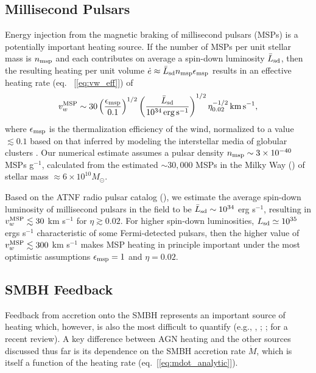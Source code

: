 \documentclass[usenatbib,fleqn]{mn2e}
\begin{document}
\subsection{Millisecond Pulsars}
Energy injection from the magnetic braking of millisecond pulsars
(MSPs) is a potentially important heating source.  If the number of
MSPs per unit stellar mass is $n_{\rm msp}$ and each contributes on
average a spin-down luminosity $\bar{L}_{\rm sd}$, then the resulting
heating per unit volume $\dot{e} \approx \bar{L}_{\rm sd}n_{\rm
  msp}\epsilon_{\rm msp}$ results in an effective heating rate (eq.~
[\ref{eq:vw_eff}]) of
\begin{eqnarray} v_{w}^{\rm MSP} \sim
30\left(\frac{\epsilon_{\rm msp}}{0.1}\right)^{1/2}\left(\frac{\bar{L}_{\rm
sd}}{10^{34}\,{\rm erg\,s^{-1}}}\right)^{1/2} \eta_{0.02}^{-1/2}\,{\rm
km\,s^{-1}},
 \label{eq:vmsp}
  \end{eqnarray} 
  where $\epsilon_{\rm msp}$ is the thermalization efficiency of the
  wind, normalized to a value $\lesssim 0.1$ based on that inferred by
  modeling the interstellar media of globular clusters
  \citep{NaimanSoares-Furtado+:2013a}.  Our numerical estimate assumes
  a pulsar density $n_{\rm msp} \sim 3 \times 10^{-40} $ MSPs
  g$^{-1}$, calculated from the estimated $\sim 30,000$ MSPs in the
  Milky Way (\citealt{Lorimer13}) of stellar mass $\approx 6\times
  10^{10}M_{\odot}$.

  Based on the ATNF radio pulsar catalog (\citealt{Manchester+05}), we
  estimate the average spin-down luminosity of millisecond pulsars in
  the field to be $\bar{L}_{\rm sd} \sim 10^{34}$ erg s$^{-1}$,
  resulting in $v_{w}^{\rm MSP} \lesssim 30$ km s$^{-1}$ for $\eta
  \gtrsim 0.02$.  For higher spin-down luminosities, $L_{\rm sd}\simeq
  10^{35}$ ergs s$^{-1}$ characteristic of some Fermi-detected
  pulsars, then the higher value of $v_{w}^{\rm MSP} \lesssim 300$ km
  s$^{-1}$ makes MSP heating in principle important under the most
  optimistic assumptions $\epsilon_{\rm msp} = 1$ and $\eta = 0.02$.



\subsection{SMBH Feedback}

Feedback from accretion onto the SMBH represents an important source of heating which, however, is also the most difficult to quantify (e.g., \citealt{Brighenti&Mathews03}, \citealt{DiMatteo+05}; \citealt{Kurosawa&Proga09}; \citealt{Fabian12} for a recent review).  A key difference between AGN heating and the other sources discussed thus far is its dependence on the SMBH accretion rate $\dot{M}$, which is itself a function of the heating rate (eq.~[\ref{eq:mdot_analytic}]).  
\end{document}
